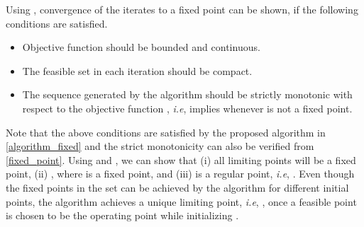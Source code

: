 Using \cite[Th. 3.1]{meyer1976sufficient}, convergence of the iterates to a fixed point can be shown, if the following conditions are satisfied.
\begin{itemize}
\item Objective function  should be bounded and continuous.
\item The feasible set  in each iteration should be compact.
\item The sequence  generated by the algorithm  should be strictly monotonic with respect to the objective function , \textit{i.e},  implies  whenever \me{\ma} is not a fixed point.
\end{itemize}
Note that the above conditions are satisfied by the proposed algorithm  in \eqref{algorithm_fixed} and the strict monotonicity can also be verified from \eqref{fixed_point}. Using \cite{zangwill1969nonlinear} and \cite[Th. 3.1]{meyer1976sufficient}, we can show that (i) all limiting points will be a fixed point, (ii) , where \eqn{\ma^\ast} is a fixed point, and (iii) \eqn{\ma^\ast} is a regular point, \textit{i.e}, . Even though the fixed points in the set  can be achieved by the algorithm  for different initial points, the algorithm  achieves a unique limiting point, \textit{i.e}, , once a feasible point is chosen to be the operating point while initializing .

